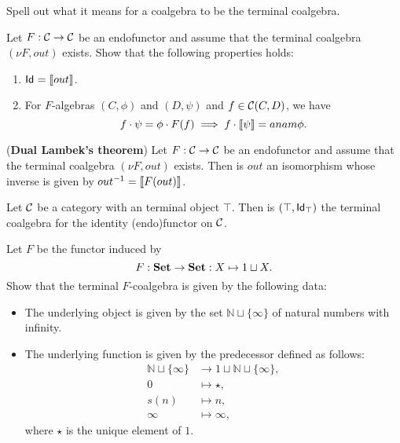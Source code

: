 \begin{exer} Spell out what it means for a coalgebra to be the terminal coalgebra.
\end{exer}

\begin{exer} Let $F:\CC\to\CC$ be an endofunctor and assume that the terminal coalgebra $(\nu F, out)$ exists. Show that the following properties holds:
\begin{enumerate}
\item $\Id = \anam{out}$.
\item For $F$-algebras $(C,\phi)$ and $(D,\psi)$ and $f\in\CHom{\CC}{C}{D}$, we have 
\[
f\Comp\psi  = \phi\Comp F(f) \implies f\Comp\anam{\psi} = anam{\phi}.
\]
\end{enumerate} 
\end{exer}

\begin{exer} (\textbf{Dual Lambek's theorem}) Let $F:\CC\to\CC$ be an endofunctor and assume that the terminal coalgebra $(\nu F, out)$ exists. Then is $out$ an isomorphism whose inverse is given by $\Inv{out} = \anam{F(out)}$.
\end{exer}

\begin{exer}\label{exercise:terminalalg_for_idfun_with_terminalob} Let $\CC$ be a category with an terminal object $\top$. Then is $(\top, \Id[\top])$ the terminal coalgebra for the identity (endo)functor on $\CC$.
\end{exer}

\begin{exer} Let $F$ be the functor induced by 
\[
F:\SET\to\SET : X\mapsto 1 \sqcup X.
\]
Show that the terminal $F$-coalgebra is given by the following data:
\begin{itemize}
\item The underlying object is given by the set $\mathbb{N} \sqcup \{\infty\}$ of natural numbers with infinity.
\item The underlying function is given by the predecessor defined as follows: 
\begin{align*}
\mathbb{N} \sqcup \{\infty\} &\to 1 \sqcup \mathbb{N} \sqcup \{\infty\},\\
0 &\mapsto \star,\\
s(n) &\mapsto n,\\
\infty &\mapsto \infty,
\end{align*}
where $\star$ is the unique element of $1$.
\end{itemize}
\end{exer}



